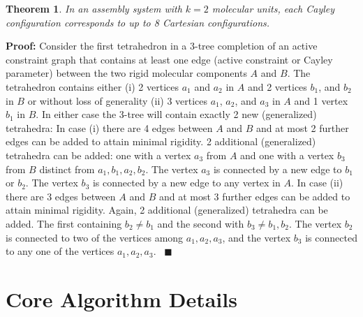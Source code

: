 \documentclass[]{article}
\newtheorem{theorem}{Theorem}[section]
\newenvironment{proof}{
    {\bf Proof:}}{\hbox{\ }\hfill $\blacksquare$\break }
\newcommand{\rmc}{rigid molecular component}
\begin{document}
\begin{theorem}
\label{thm:realization}
In an assembly system with $k=2$ molecular units, each Cayley configuration
corresponds to up to 8 Cartesian configurations.
\end{theorem}
\begin{proof}
Consider the first tetrahedron in a 3-tree completion of an active constraint
graph that contains at least one edge (active constraint or Cayley parameter)
between the two \rmc s $A$ and $B$. The tetrahedron contains either (i) 2
vertices $a_1$ and $a_2$ in $A$ and 2 vertices $b_1$, and $b_2$ in $B$ 
or without loss of generality (ii) 3 vertices $a_1$, $a_2$, and $a_3$ in 
$A$ and 1 vertex $b_1$ in $B$.  In either case the 3-tree will contain
exactly 2 new (generalized) tetrahedra: In case (i) there are 4 edges between
$A$ and $B$ and at most 2 further edges can be added to attain minimal rigidity.
2 additional (generalized) tetrahedra can be added: one with a vertex $a_3$ 
from $A$ and one with a vertex $b_3$ from $B$ distinct from $a_1, b_1, a_2, b_2$. 
The vertex $a_3$ is connected by a new edge to $b_1$ or $b_2$.
The vertex $b_3$ is connected by a new edge to any vertex in $A$. In case (ii) there
are 3 edges between $A$ and $B$ and at most 3 further edges can be added to attain
minimal rigidity. Again, 2 additional (generalized) tetrahedra can be added. The first
containing $b_2 \ne b_1$ and the second with $b_3 \ne b_1, b_2$. 
The vertex $b_2$ is connected to two of the vertices among $a_1, a_2, a_3$,
and the vertex $b_3$ is connected to any one of the vertices $a_1, a_2, a_3$.
\end{proof}

\section{Core Algorithm Details}
\label{sec:app:algorithm}
\end{document}
